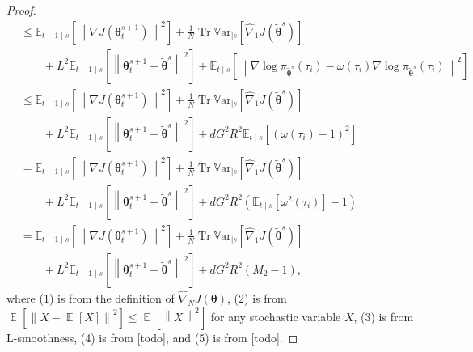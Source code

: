 \documentclass{article}
\theoremstyle{remark}
\theoremstyle{definition}
\DeclareMathOperator*{\EV}{\mathbb{E}}
\DeclareMathOperator{\Tr}{Tr}
\newcommand{\EVV}[2][\ppvect \in \ppspace]{\EV_{#1}\left[{#2}\right]}
\newcommand{\norm}[2][\infty]{\left\|#2\right\|_{#1}}
\newcommand{\vtheta}{\boldsymbol{\theta}}
\newcommand{\score}[2]{\nabla\log\pi_{#1}(#2)}
\newcommand{\gradJ}[1]{\nabla J(#1)}
\newcommand{\gradApp}[2]{\hat{\nabla}_{#2}J(#1)}
\newcommand{\Ets}[2][t]{\mathbb{E}_{#1\mid s}\left[#2\right]}
\newcommand{\Varts}[2][t]{{\mathbb{V}\text{ar}}_{#1\mid s}\left[#2\right]}
\begin{document}
\begin{proof}
\begin{align}
	&\leq \Ets[t-1]{\norm[]{\gradJ{\vtheta_t^{s+1}}}^2} 
	+\frac{1}{N}\Tr\Varts[]{\gradApp{\tilde{\vtheta}^s}{1}}
	\nonumber\\
	&\qquad+L^2\Ets[t-1]{\norm[]{\vtheta_t^{s+1}-\tilde{\vtheta}^s}^2}
	+\Ets{\norm[]{\score{\tilde{\vtheta}^s}{\tau_i} 
			-\omega(\tau_i)\score{\tilde{\vtheta}^s}{\tau_i}}^2} \\
	&\leq \Ets[t-1]{\norm[]{\gradJ{\vtheta_t^{s+1}}}^2} 
	+\frac{1}{N}\Tr\Varts[]{\gradApp{\tilde{\vtheta}^s}{1}}
	\nonumber\\
	&\qquad+L^2\Ets[t-1]{\norm[]{\vtheta_t^{s+1}-\tilde{\vtheta}^s}^2}
	+dG^2R^2\Ets{(\omega(\tau_i)-1)^2} \\
	&= \Ets[t-1]{\norm[]{\gradJ{\vtheta_t^{s+1}}}^2} 
	+\frac{1}{N}\Tr\Varts[]{\gradApp{\tilde{\vtheta}^s}{1}}
	\nonumber\\
	&\qquad+L^2\Ets[t-1]{\norm[]{\vtheta_t^{s+1}-\tilde{\vtheta}^s}^2}
	+dG^2R^2\left(\Ets{\omega^2(\tau_i)}-1\right) \nonumber\\
	&= \Ets[t-1]{\norm[]{\gradJ{\vtheta_t^{s+1}}}^2} 
	+\frac{1}{N}\Tr\Varts[]{\gradApp{\tilde{\vtheta}^s}{1}}
	\nonumber\\
	&\qquad+L^2\Ets[t-1]{\norm[]{\vtheta_t^{s+1}-\tilde{\vtheta}^s}^2}
	+dG^2R^2\left(M_2-1\right),
\end{align}
where (1) is from the definition of $\gradApp{\vtheta}{N}$, (2) is from $\EVV[]{\norm[]{X-\EVV[]{X}}^2}\leq\EVV[]{\norm[]{X}^2}$ for any stochastic variable $X$, (3) is from L-smoothness, 
(4) is from [todo], and (5) is from [todo].
\end{proof}
\end{document}
